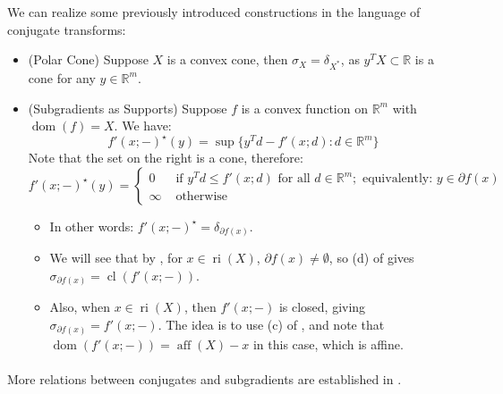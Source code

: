 \begin{exmp}We can realize some previously introduced constructions in the language of conjugate transforms:
	\begin{itemize}
		\item (Polar Cone) Suppose $X$ is a convex cone, then $\sigma_X=\delta_{X^\ast}$, as $y^TX\subset \mathbb{R}$ is a cone for any $y\in \mathbb{R}^m$.
		\item (Subgradients as Supports) Suppose $f$ is a convex function on $\mathbb{R}^m$ with $\operatorname{dom}(f)=X$. We have:
		      \[
			      f'(x;-)^\star(y) = \sup \{y^Td - f'(x; d):d\in \mathbb{R}^m\}
		      \]
		      Note that the set on the right is a cone, therefore:
		      \[
			      f'(x;-)^\star(y) = \begin{cases}
				      0      & \text{ if }y^Td \leq f'(x;d)\text{ for all }d\in \mathbb{R}^m;\text{ equivalently: }y\in\partial f(x) \\
				      \infty & \text{ otherwise}
			      \end{cases}
		      \]
		      \begin{itemize}
			      \item In other words: $f'(x;-)^\star = \delta_{\partial f(x)}$.
			      \item We will see that by , for $x\in \operatorname{ri}(X)$, $\partial f(x)\neq\emptyset$, so (d) of  gives $\sigma_{\partial f(x)}=\operatorname{cl}(f'(x;-))$.
			      \item Also, when $x\in \operatorname{ri}(X)$, then $f'(x;-)$ is closed, giving $\sigma_{\partial f(x)}=f'(x;-)$. The idea is to use (c) of , and note that $\operatorname{dom}(f'(x;-))=\operatorname{aff}(X)-x$ in this case, which is affine. %
		      \end{itemize}
	\end{itemize}
\end{exmp}

\paragraph{}More relations between conjugates and subgradients are established in .

